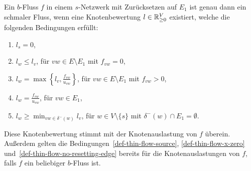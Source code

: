 \begin{lemma}\label{lemma-thin-flow-t-def}
	Ein $b$-Fluss $f$ in einem $s$-Netzwerk mit Zurücksetzen auf $E_1$ ist genau dann ein schmaler Fluss, wenn eine Knotenbewertung $l\in\mathbb{R}_{\geq 0}^V$ existiert, welche die folgenden Bedingungen erfüllt:
	\begin{enumerate}[label=(T\arabic*)]
		\item\label{def-thin-flow-source} $\displaystyle l_s = 0$,
		\item\label{def-thin-flow-x-zero} $\displaystyle l_w \leq l_v$, \tabto{4.5cm} für $vw\in E \setminus E_1$ mit $f_{vw}=0$,
		\item\label{def-thin-flow-x-positive} $\displaystyle l_w = \max\left\{ l_v, \frac{f_{vw}}{u_{vw}} \right\}$, \tabto{4.5cm} für $vw\in E\setminus E_1$ mit $f_{vw} > 0$,
		\item\label{def-thin-flow-resetting-edge} $\displaystyle l_w = \frac{f_{vw}}{u_{vw}}$, \tabto{4.5cm} für $vw\in E_1$,
		\item\label{def-thin-flow-no-resetting-edge} $\displaystyle l_w \geq \min_{vw\in \delta^-(w)} l_v$, \tabto{4.5cm} für $w\in V\setminus \{ s \}$ mit $\delta^-(w)\cap E_1 = \emptyset$.
	\end{enumerate}
	Diese Knotenbewertung stimmt mit der Knotenauslastung von $f$ überein.
	Außerdem gelten die Bedingungen~\ref{def-thin-flow-source}, \ref{def-thin-flow-x-zero} und~\ref{def-thin-flow-no-resetting-edge} bereits für die Knotenauslastungen von $f$, falls $f$ ein beliebiger $b$-Fluss ist.
\end{lemma}
